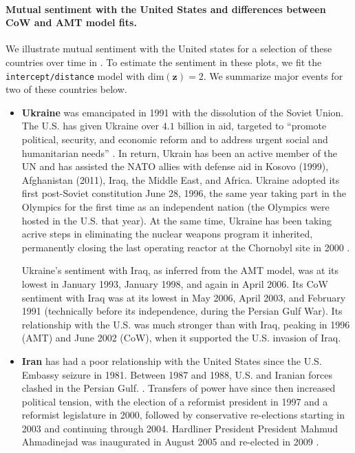 \paragraph{Mutual sentiment with the United States and differences
 between CoW and AMT model fits.}
We illustrate mutual sentiment with the United states for a selection
of these countries over time in .
To estimate the sentiment in these plots, we fit the
\verb!intercept/distance! model with $\mbox{dim}(\bm z) = 2$.
We summarize major events for two of these countries below.
\begin{itemize}
  \item \textbf{Ukraine} was emancipated in 1991 with the dissolution
    of the Soviet Union.  The U.S. has given Ukraine over $4.1$
    billion in aid, targeted to ``promote political, security, and
    economic reform and to address urgent social and humanitarian
    needs'' \citep{ukrainestate:2012}.  In return, Ukrain has been an
    active member of the UN and has assisted the NATO allies with
    defense aid in Kosovo (1999), Afghanistan (2011), Iraq, the Middle
    East, and Africa.  Ukraine adopted its first post-Soviet
    constitution June 28, 1996, the same year taking part in the
    Olympics for the first time as an independent nation (the Olympics
    were hosted in the U.S. that year).  At the same time, Ukraine has
    been taking acrive steps in eliminating the nuclear weapons
    program it inherited, permanently closing the last operating
    reactor at the Chornobyl site in 2000 \citep{ukrainestate:2012}.

    Ukraine's sentiment with Iraq, as inferred from the AMT model, was
    at its lowest in January 1993, January 1998, and again in April
    2006.  Its CoW sentiment with Iraq was at its lowest in May 2006,
    April 2003, and February 1991 (technically before its
    independence, during the Persian Gulf War). Its relationship with
    the U.S. was much stronger than with Iraq, peaking in 1996 (AMT)
    and June 2002 (CoW), when it supported the U.S. invasion of Iraq.

  \item \textbf{Iran} has had a poor relationship with the United
    States since the U.S. Embassy seizure in 1981.  Between 1987 and
    1988, U.S. and Iranian forces clashed in the Persian Gulf.
    \citep{irancia:2012}.  Transfers of power have since then increased
    political tension, with the election of a reformist president in
    1997 and a reformist legislature in 2000, followed by conservative
    re-elections starting in 2003 and continuing through 2004.
    Hardliner President President Mahmud Ahmadinejad was inaugurated
    in August 2005 and re-elected in 2009 \citep{irancia:2012}.


\end{itemize}
